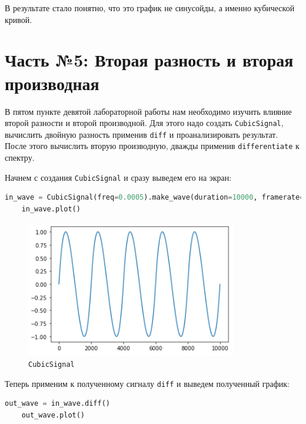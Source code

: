 \documentclass[a4paper]{article}
\begin{document}
            В результате стало понятно, что это график не синусойды, а именно кубической кривой.
            
    \newpage
        \section{Часть №5: Вторая разность и вторая производная}
            В пятом пункте девятой лабораторной работы нам необходимо изучить влияние второй разности и второй производной. Для этого надо создать \texttt{CubicSignal}, вычислить двойную разность применив \texttt{diff} и проанализировать результат. После этого вычислить вторую производную, дважды применив \texttt{differentiate} к спектру. 
            
            Начнем с создания \texttt{CubicSignal} и сразу выведем его на экран:
            
\begin{lstlisting}[language=Python, caption= Создание и вывод \texttt{CubicSignal}]
    in_wave = CubicSignal(freq=0.0005).make_wave(duration=10000, framerate=1)
    in_wave.plot()
\end{lstlisting}
            
            \begin{figure}[H]
                \centering
                \includegraphics{ex_5_1.png}
                \caption{\texttt{CubicSignal}}
                \label{fig:ex_5_1}
            \end{figure}
            
            Теперь применим к полученному сигналу \texttt{diff} и выведем полученный график:
            
\begin{lstlisting}[language=Python, caption= Применение \texttt{diff}]
    out_wave = in_wave.diff()
    out_wave.plot()
\end{lstlisting}
            
\end{document}
